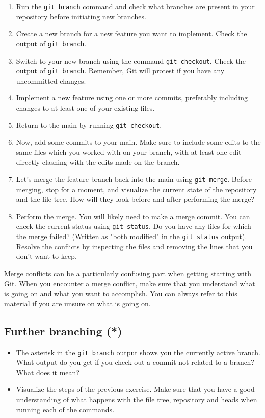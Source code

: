 \documentclass[../main/git_course_main.tex]{subfiles}
\begin{document}
	\begin{enumerate}
		\item Run the \verb$git branch$ command and check what branches are present in your repository before initiating new branches.
		\item Create a new branch for a new feature you want to implement. Check the output of \verb$git branch$.
		\item Switch to your new branch using the command \verb$git checkout$. Check the output of \verb$git branch$. Remember, Git will protest if you have any uncommitted changes.
		\item Implement a new feature using one or more commits, preferably including changes to at least one of your existing files.
		\item Return to the main by running \verb$git checkout$.
		\item Now, add some commits to your main. Make sure to include some edits to the same files which you worked with on your branch, with at least one edit directly clashing with the edits made on the branch.
		\item Let's merge the feature branch back into the main using \verb$git merge$. Before merging, stop for a moment, and visualize the current state of the repository and the file tree. How will they look before and after performing the merge?
		\item Perform the merge. You will likely need to make a merge commit. You can check the current status using \verb$git status$. Do you have any files for which the merge failed? (Written as "both modified" in the \verb$git status$ output). Resolve the conflicts by inspecting the files and removing the lines that you don't want to keep.	
	\end{enumerate}
	
	Merge conflicts can be a particularly confusing part when getting starting with Git. When you encounter a merge conflict, make sure that you understand what is going on and what you want to accomplish. You can always refer to this material if you are unsure on what is going on.
	
	\subsection{Further branching (*)}
	
	\begin{itemize}
		\item The asterisk in the \verb$git branch$ output shows you the currently active branch. What output do you get if you check out a commit not related to a branch? What does it mean?
		\item Visualize the steps of the previous exercise. Make sure that you have a good understanding of what happens with the file tree, repository and heads when running each of the commands.
	\end{itemize}
	
\end{document}
